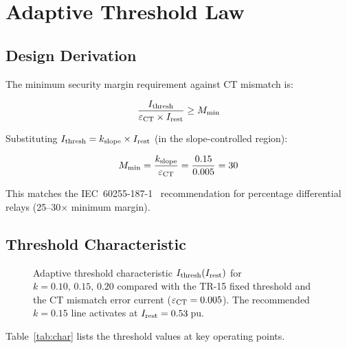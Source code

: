 \documentclass[11pt, a4paper]{article}
\begin{document}
\section{Adaptive Threshold Law}
\label{sec:law}

\subsection{Design Derivation}

The minimum security margin requirement against CT mismatch is:

\begin{equation}
  \frac{I_{\rm thresh}}{\varepsilon_{\rm CT} \times I_{\rm rest}} \geq M_{\rm min}
\end{equation}

Substituting $I_{\rm thresh} = k_{\rm slope} \times I_{\rm rest}$ (in the
slope-controlled region):

\begin{equation}
  M_{\rm min} = \frac{k_{\rm slope}}{\varepsilon_{\rm CT}}
              = \frac{0.15}{0.005} = 30
\end{equation}

This matches the IEC~60255-187-1~\cite{IEC_60255_187} recommendation for
percentage differential relays (25--30$\times$ minimum margin).

\subsection{Threshold Characteristic}

\begin{figure}[h]
  \centering
  
  \caption{Adaptive threshold characteristic $I_{\rm thresh}(I_{\rm rest})$
           for $k=0.10,\,0.15,\,0.20$ compared with the TR-15 fixed threshold
           and the CT mismatch error current ($\varepsilon_{\rm CT}=0.005$).
           The recommended $k=0.15$ line activates at $I_{\rm rest}=0.53$\,pu.}
  \label{fig:char}
\end{figure}

Table~\ref{tab:char} lists the threshold values at key operating points.
\end{document}
